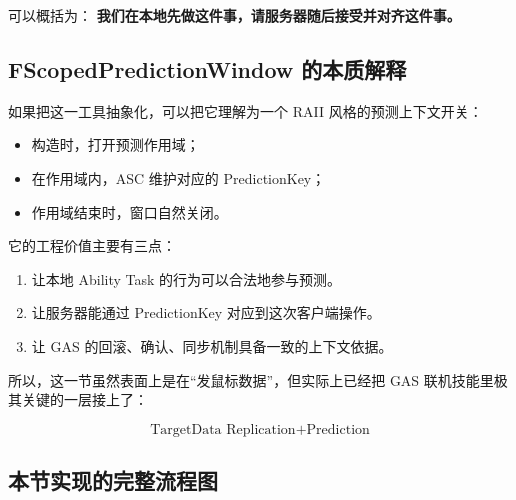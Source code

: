 \documentclass[10pt,CJKmath]{ctexart}
\begin{document}
可以概括为：	\textbf{我们在本地先做这件事，请服务器随后接受并对齐这件事。}

\subsection{FScopedPredictionWindow 的本质解释}

如果把这一工具抽象化，可以把它理解为一个 RAII 风格的预测上下文开关：

\begin{itemize}
	\item 构造时，打开预测作用域；
	\item 在作用域内，ASC 维护对应的 PredictionKey；
	\item 作用域结束时，窗口自然关闭。
\end{itemize}

它的工程价值主要有三点：

\begin{enumerate}
	\item 让本地 Ability Task 的行为可以合法地参与预测。
	\item 让服务器能通过 PredictionKey 对应到这次客户端操作。
	\item 让 GAS 的回滚、确认、同步机制具备一致的上下文依据。
\end{enumerate}

所以，这一节虽然表面上是在“发鼠标数据”，但实际上已经把 GAS 联机技能里极其关键的一层接上了：

\[
\text{TargetData Replication} + \text{Prediction}
\]

\subsection{本节实现的完整流程图}
\end{document}
